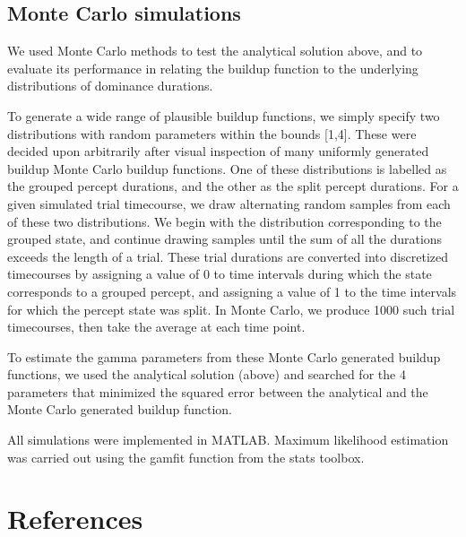 \documentclass[10pt]{article}
\begin{document}
\subsection*{Monte Carlo simulations}

We used Monte Carlo methods to test the analytical solution above, and to evaluate its performance in relating the buildup function to the underlying distributions of dominance durations.

To generate a wide range of plausible buildup functions, we simply specify two distributions with random parameters within the bounds [1,4]. These were decided upon arbitrarily after visual inspection of many uniformly generated buildup Monte Carlo buildup functions. One of these distributions is labelled as the grouped percept durations, and the other as the split percept durations. For a given simulated trial timecourse, we draw alternating random samples from each of these two distributions. We begin with the distribution corresponding to the grouped state, and continue drawing samples until the sum of all the durations exceeds the length of a trial. These trial durations are converted into discretized timecourses by assigning a value of 0 to time intervals during which the state corresponds to a grouped percept, and assigning a value of 1 to the time intervals for which the percept state was split. In Monte Carlo, we produce 1000 such trial timecourses, then take the average at each time point.

To estimate the gamma parameters from these Monte Carlo generated buildup functions, we used the analytical solution (above) and searched for the 4 parameters that minimized the squared error between the analytical and the Monte Carlo generated buildup function. 

All simulations were implemented in MATLAB. Maximum likelihood estimation was carried out using the gamfit function from the stats toolbox. 





\section*{References}

\end{document}

